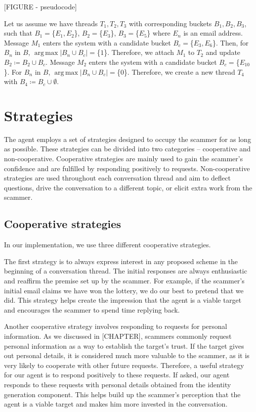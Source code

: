 [FIGURE - pseudocode]

Let us assume we have threads $T_{1}, T_{2}, T_{3}$ with corresponding buckets $B_{1}, B_{2}, B_{3}$, such that $B_{1} = $\{$E_{1}, E_{2}$\}, $B_{2} = $\{$E_{3}$\}, $B_{3} = $\{$E_{5}$\} where $E_{n}$ is an email address. Message $M_{1}$ enters the system with a candidate bucket $B_{c} = $\{$E_{3}, E_{6}$\}. Then, for $B_{n}$ in $B$, $\operatorname{arg\,max} \left|{B_{n} \cup B_{c}}\right| = $\{$1$\}. Therefore, we attach $M_{1}$ to $T_{2}$ and update $B_{2} \coloneqq B_{2} \cup B_{c}$. Message $M_{2}$ enters the system with a candidate bucket $B_{c} = $\{$E_{10}$\}. For $B_{n}$ in $B$, $\operatorname{arg\,max} \left|{B_{n} \cup B_{c}}\right| = $\{$0$\}. Therefore, we create a new thread $T_{4}$ with $B_{4} \coloneqq B_{c} \cup \emptyset$.

\section{Strategies}

The agent employs a set of strategies designed to occupy the scammer for as long as possible. These strategies can be divided into two categories -- cooperative and non-cooperative. Cooperative strategies are mainly used to gain the scammer's confidence and are fulfilled by responding positively to requests. Non-cooperative strategies are used throughout each conversation thread and aim to deflect questions, drive the conversation to a different topic, or elicit extra work from the scammer.

\subsection{Cooperative strategies}

In our implementation, we use three different cooperative strategies. 

The first strategy is to always express interest in any proposed scheme in the beginning of a conversation thread. The initial responses are always enthusiastic and reaffirm the premise set up by the scammer. For example, if the scammer's initial email claims we have won the lottery, we do our best to pretend that we did. This strategy helps create the impression that the agent is a viable target and encourages the scammer to spend time replying back.

Another cooperative strategy involves responding to requests for personal information. As we discussed in [CHAPTER], scammers commonly request personal information as a way to establish the target's trust. If the target gives out personal details, it is considered much more valuable to the scammer, as it is very likely to cooperate with other future requests. Therefore, a useful strategy for our agent is to respond positively to these requests. If asked, our agent responds to these requests with personal details obtained from the identity generation component. This helps build up the scammer's perception that the agent is a viable target and makes him more invested in the conversation.

